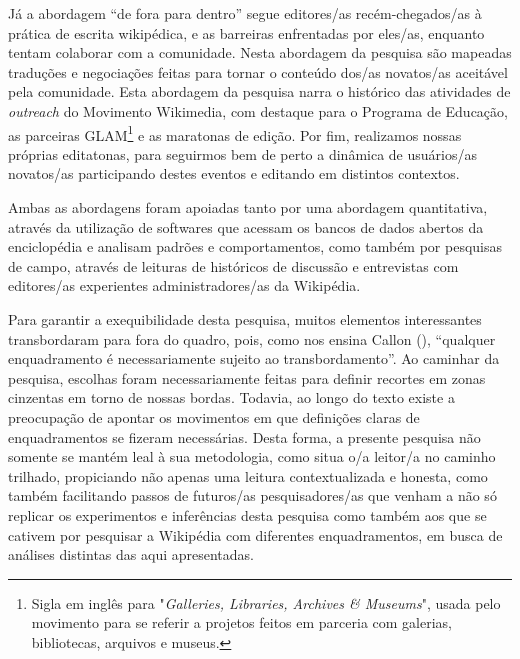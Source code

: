 Já a abordagem ``de fora para dentro'' segue editores/as recém-chegados/as à prática de escrita wikipédica, e as barreiras enfrentadas por eles/as, enquanto tentam colaborar com a comunidade. Nesta abordagem da pesquisa são mapeadas traduções e negociações feitas para tornar o conteúdo dos/as novatos/as aceitável pela comunidade. Esta abordagem da pesquisa narra o histórico das atividades de \textit{outreach} do Movimento Wikimedia, com destaque para o Programa de Educação, as parceiras GLAM\footnote{Sigla em inglês para "\textit{Galleries, Libraries, Archives \& Museums}", usada pelo movimento para se referir a projetos feitos em parceria com galerias, bibliotecas, arquivos e museus.} e as maratonas de edição. Por fim, realizamos nossas próprias editatonas, para seguirmos bem de perto a dinâmica de usuários/as novatos/as participando destes eventos e editando em distintos contextos.

Ambas as abordagens foram apoiadas tanto por uma abordagem quantitativa, através da utilização de softwares que acessam os bancos de dados abertos da enciclopédia e analisam padrões e comportamentos, como também por pesquisas de campo, através de leituras de históricos de discussão e entrevistas com editores/as experientes administradores/as da Wikipédia.

Para garantir a exequibilidade desta pesquisa, muitos elementos interessantes transbordaram para fora do quadro, pois, como nos ensina Callon (\citeyear[18]{callon_markets_1998}), ``qualquer enquadramento é necessariamente sujeito ao transbordamento''. Ao caminhar da pesquisa, escolhas foram necessariamente feitas para definir recortes em zonas cinzentas em torno de nossas bordas. Todavia, ao longo do texto existe a preocupação de apontar os movimentos em que definições claras de enquadramentos se fizeram necessárias. Desta forma, a presente pesquisa não somente se mantém leal à sua metodologia, como situa o/a leitor/a no caminho trilhado, propiciando não apenas uma leitura contextualizada e honesta, como também facilitando passos de futuros/as pesquisadores/as que venham a não só replicar os experimentos e inferências desta pesquisa como também aos que se cativem por pesquisar a Wikipédia com diferentes enquadramentos, em busca de análises distintas das aqui apresentadas.


